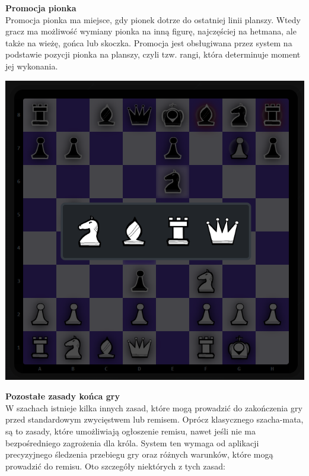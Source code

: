 \documentclass[twoside]{projektInzynierskiMS1}
\begin{document}
\noindent
\begin{minipage}[t]{0.6\textwidth} 
    \vspace{0pt} 
    \justifying 
    \noindent 
    \textbf{Promocja pionka}\\
    Promocja pionka ma miejsce, gdy pionek dotrze do ostatniej linii planszy. Wtedy gracz ma możliwość wymiany pionka na inną figurę, najczęściej na hetmana, ale także na wieżę, gońca lub skoczka. Promocja jest obsługiwana przez system na podstawie pozycji pionka na planszy, czyli tzw. rangi, która determinuje moment jej wykonania.
\end{minipage} 
\hfill 
\begin{minipage}[t]{0.3\textwidth} 
    \vspace{0pt} 
    \centering 
    \includegraphics[width=\linewidth]{images/imp_front_promotion.png} 
\end{minipage}

\newpage

\noindent \textbf{Pozostałe zasady końca gry}\\
W szachach istnieje kilka innych zasad, które mogą prowadzić do zakończenia gry przed standardowym zwycięstwem lub remisem. Oprócz klasycznego szacha-mata, są to zasady, które umożliwiają ogłoszenie remisu, nawet jeśli nie ma bezpośredniego zagrożenia dla króla. System ten wymaga od aplikacji precyzyjnego śledzenia przebiegu gry oraz różnych warunków, które mogą prowadzić do remisu. Oto szczegóły niektórych z tych zasad:
\end{document}
